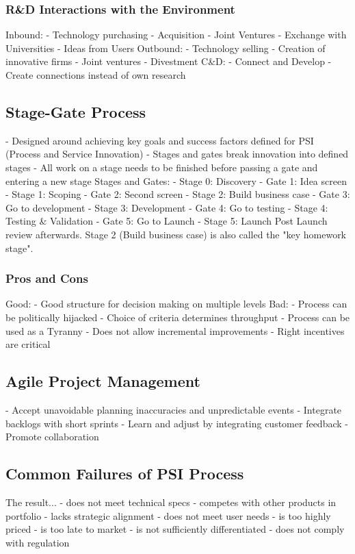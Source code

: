 \documentclass{scrartcl}
\begin{document}
\subsubsection*{R\&D Interactions with the Environment}
Inbound:
- Technology purchasing
- Acquisition
- Joint Ventures
- Exchange with Universities
- Ideas from Users
Outbound:
- Technology selling
- Creation of innovative firms
- Joint ventures
- Divestment
C\&D:
- Connect and Develop
- Create connections instead of own research
\subsection*{Stage-Gate Process}
- Designed around achieving key goals and success factors defined for PSI (Process and Service Innovation)
- Stages and gates break innovation into defined stages
- All work on a stage needs to be finished before passing a gate and entering a new stage
Stages and Gates:
- Stage 0: Discovery
- Gate 1: Idea screen
- Stage 1: Scoping
- Gate 2: Second screen
- Stage 2: Build business case
- Gate 3: Go to development
- Stage 3: Development
- Gate 4: Go to testing
- Stage 4: Testing \& Validation
- Gate 5: Go to Launch
- Stage 5: Launch
Post Launch review afterwards. Stage 2 (Build business case) is also called the "key homework stage".
\subsubsection*{Pros and Cons}
Good:
- Good structure for decision making on multiple levels
Bad:
- Process can be politically hijacked
- Choice of criteria determines throughput
- Process can be used as a Tyranny
- Does not allow incremental improvements
- Right incentives are critical
\subsection*{Agile Project Management}
- Accept unavoidable planning inaccuracies and unpredictable events
- Integrate backlogs with short sprints
- Learn and adjust by integrating customer feedback
- Promote collaboration
\subsection*{Common Failures of PSI Process}
The result...
- does not meet technical specs
- competes with other products in portfolio
- lacks strategic alignment
- does not meet user needs
- is too highly priced
- is too late to market
- is not sufficiently differentiated
- does not comply with regulation
\end{document}

